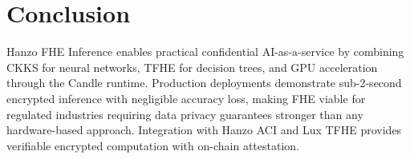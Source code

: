 \section{Conclusion}

\label{sec:conclusion}

Hanzo FHE Inference enables practical confidential AI-as-a-service by combining
CKKS for neural networks, TFHE for decision trees, and GPU acceleration through
the Candle runtime. Production deployments demonstrate sub-2-second encrypted
inference with negligible accuracy loss, making FHE viable for regulated
industries requiring data privacy guarantees stronger than any hardware-based
approach. Integration with Hanzo ACI and Lux TFHE provides verifiable encrypted
computation with on-chain attestation.

\label{sec:threshold}

